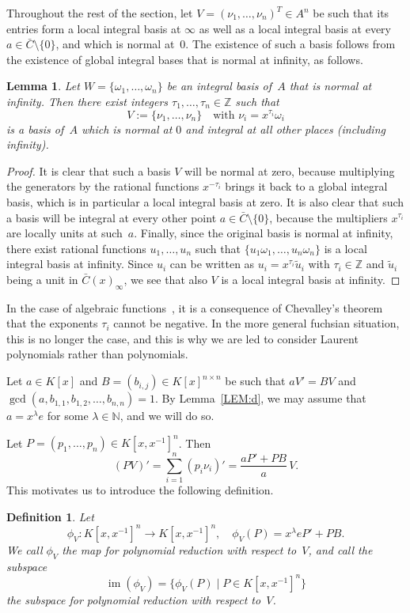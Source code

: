 \documentclass[final,1p,times,authoryear]{elsarticle}
\newtheorem{lemma}[theorem]{Lemma}
\newtheorem{defi}[theorem]{Definition}
\let\set\mathbb
\def\im{\operatorname{im}}
\begin{document}
Throughout the rest of the section, let $V = (\nu_1, \ldots, \nu_n)^T\in A^n$ be such that its entries
form a local integral basis at $\infty$ as well as a local integral basis at every $a\in\bar C\setminus\{0\}$,
and which is normal at~$0$.
The existence of such a basis follows from the existence of global integral bases that is normal at infinity,
as follows.

\begin{lemma}\label{LM:CB}
Let $W =\{\omega_1, \ldots, \omega_n\}$ be an integral basis of~$A$ that is normal at infinity. Then
there exist integers $\tau_1, \ldots, \tau_n\in\set Z$ such that
\[
  V := \{\nu_1, \ldots, \nu_n\} \quad \text{with $\nu_i = x^{\tau_i} \omega_i$}
\]
is a basis of~$A$ which is normal at $0$ and integral at all other places (including infinity).
\end{lemma}
\begin{proof}
It is clear that such a basis $V$ will be normal at zero, because multiplying the generators by
the rational functions $x^{-\tau_i}$ brings it back to a global integral basis, which is in particular
a local integral basis at zero.
It is also clear that such a basis will be integral at every other point $a\in\bar C\setminus\{0\}$, because the
multipliers $x^{\tau_i}$ are locally units at such~$a$.
Finally, since the original basis is normal at infinity, there exist rational functions $u_1,\dots,u_n$
such that $\{u_1\omega_1,\dots,u_n\omega_n\}$ is a local integral basis at infinity.
Since $u_i$ can be written as $u_i=x^{\tau_i}\tilde{u}_i$ with $\tau_i\in\set Z$ and $\tilde{u}_i$ being a unit
in $\bar{C}(x)_\infty$, we see that also $V$ is a local integral basis at infinity.
\end{proof}

In the case of algebraic functions~\citep{chen16}, it is a consequence of Chevalley's theorem that the exponents
$\tau_i$ cannot be negative. In the more general fuchsian situation, this is no longer the case, and this is
why we are led to consider Laurent polynomials rather than polynomials. 

Let $a\in K[x]$ and $B = (b_{i, j})\in K[x]^{n \times n}$ be such that $aV'=BV$ and
$\gcd(a, b_{1, 1}, b_{1, 2}, \ldots, b_{n ,n})=1$. By Lemma~\ref{LEM:d}, we may assume that
$a=x^\lambda e$ for some $\lambda\in\set N$, and we will do so. 

Let $P = (p_1, \ldots, p_n)\in K[x,x^{-1}]^n$. Then
\begin{equation} \label{EQ:polyred}
  (PV)' = \sum_{i=1}^n (p_i \nu_i)' = \frac{aP' + PB}{a}\,V.
\end{equation}
This motivates us to introduce the following definition.
\begin{defi}
  Let 
  \[
    \phi_V\colon K[x,x^{-1}]^n \rightarrow K[x,x^{-1}]^n,\quad
    \phi_V(P) = x^\lambda eP' + PB.
  \]
We call $\phi_V$ the \emph{map for polynomial reduction} with respect to~$V$, and call
the subspace
\[
 \im(\phi_V) = \{\phi_V(P) \mid P \in K[x,x^{-1}]^n\}
\]
the \emph{subspace for polynomial reduction} with respect to~$V$.
\end{defi}
\end{document}
